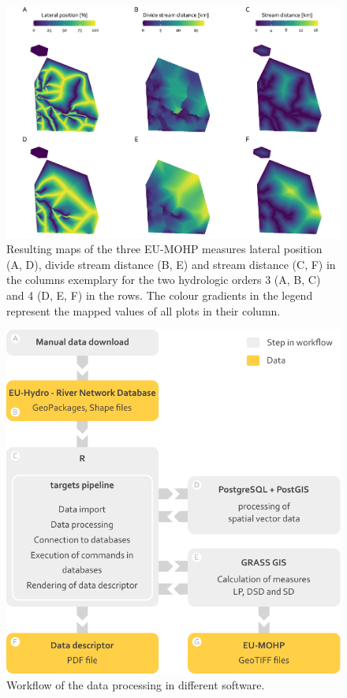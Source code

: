 \documentclass[fleqn,10pt]{wlscirep}
\begin{document}
\normalsize

\renewcommand{\arraystretch}{1}

\footnotesize

\begin{figure}[H]

{\centering \includegraphics[width=1\linewidth]{data_descriptor/tex/figure-datasetmapoverviewplot-1} 

}

\caption{Resulting maps of the three EU-MOHP measures lateral position (A, D), divide stream distance (B, E) and stream distance (C, F) in the columns exemplary for the two hydrologic orders 3 (A, B, C) and 4 (D, E, F) in the rows. The colour gradients in the legend represent the mapped values of all plots in their column.}\label{fig:datasetmapoverviewplot}
\end{figure}

\normalsize

\footnotesize

\begin{figure}[H]

{\centering \includegraphics[width=0.7\linewidth]{data_descriptor/tex/workflow_figure} 

}

\caption{Workflow of the data processing in different software.}\label{fig:workflowfigure}
\end{figure}
\end{document}
